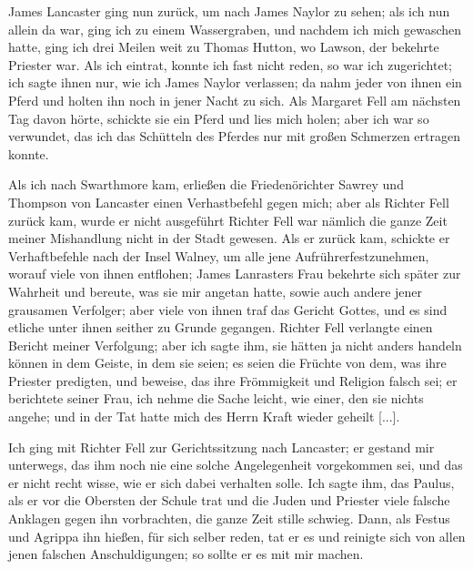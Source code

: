 James Lancaster
ging nun zurück, um nach James Naylor zu sehen; als ich nun
allein da war, ging ich zu einem Wassergraben, und nachdem ich
mich gewaschen hatte, ging ich drei Meilen weit zu Thomas
Hutton, wo Lawson, 
der bekehrte Priester war. Als ich eintrat,
konnte ich fast nicht reden, so war ich zugerichtet; 
ich sagte ihnen nur,
wie ich James Naylor verlassen; da nahm jeder von ihnen ein
Pferd und holten ihn noch in jener Nacht zu sich. Als Margaret
Fell am nächsten Tag davon hörte, 
schickte sie ein Pferd und lies
mich holen; aber ich war so verwundet, das ich das Schütteln
des Pferdes nur mit großen Schmerzen ertragen konnte. 

Als ich
nach Swarthmore kam, erließen die Friedenörichter Sawrey und
Thompson von Lancaster einen Verhastbefehl gegen mich; aber
als Richter Fell zurück kam, wurde er nicht ausgeführt Richter
Fell war nämlich die ganze Zeit meiner Mishandlung nicht in
der Stadt gewesen. Als er zurück kam, schickte er Verhaftbefehle
nach der Insel Walney, um alle jene Aufrührerfestzunehmen,
worauf viele von ihnen entflohen; James Lanrasters Frau 
bekehrte sich später zur Wahrheit und bereute, was sie mir 
angetan hatte, sowie auch andere jener grausamen Verfolger; aber
viele von ihnen traf das Gericht Gottes, 
und es sind etliche unter
ihnen seither zu Grunde gegangen. Richter Fell verlangte einen
Bericht meiner Verfolgung; aber ich sagte ihm, sie hätten ja nicht
anders handeln können in dem Geiste, in dem sie seien; es seien
die Früchte von dem, was ihre Priester predigten, und beweise,
das ihre Frömmigkeit und Religion falsch sei; er berichtete seiner
Frau, ich nehme die Sache leicht, wie einer, den sie nichts angehe;
und in der Tat hatte mich des Herrn Kraft wieder 
geheilt [...].

Ich ging mit Richter Fell zur Gerichtssitzung 
nach Lancaster;
er gestand mir unterwegs, das ihm noch nie eine solche 
Angelegenheit vorgekommen sei, und das er nicht recht wisse, wie
er sich dabei verhalten solle. Ich sagte ihm, das Paulus, als
er vor die Obersten der Schule trat und die Juden und Priester
viele falsche Anklagen gegen ihn vorbrachten, die ganze Zeit stille
schwieg. Dann, als Festus und Agrippa ihn hießen, für sich selber
reden, tat er es und reinigte sich von allen jenen falschen 
Anschuldigungen; so sollte er es mit mir machen. 

